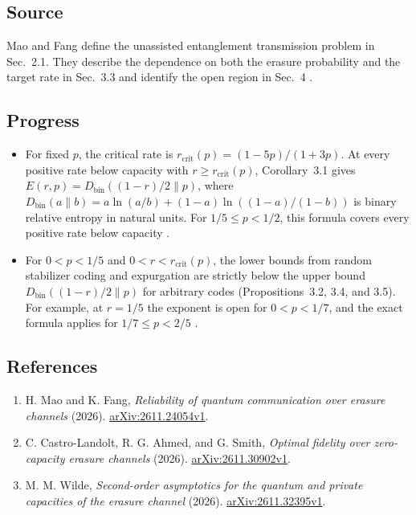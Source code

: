 \subsection*{Source}

Mao and Fang define the unassisted entanglement transmission problem in Sec.~2.1. They describe the dependence on both the erasure probability and the target rate in Sec.~3.3 and identify the open region in Sec.~4 .

\subsection*{Progress}

\begin{itemize}
  \item For fixed $p$, the critical rate is $r_{\mathrm{crit}}(p)=(1-5p)/(1+3p)$. At every positive rate below capacity with $r\geq r_{\mathrm{crit}}(p)$, Corollary~3.1 gives $E(r,p)=D_{\mathrm{bin}}((1-r)/2\|p)$, where $D_{\mathrm{bin}}(a\|b)=a\ln(a/b)+(1-a)\ln((1-a)/(1-b))$ is binary relative entropy in natural units. For $1/5\leq p<1/2$, this formula covers every positive rate below capacity .

  \item For $0<p<1/5$ and $0<r<r_{\mathrm{crit}}(p)$, the lower bounds from random stabilizer coding and expurgation are strictly below the upper bound $D_{\mathrm{bin}}((1-r)/2\|p)$ for arbitrary codes (Propositions~3.2, 3.4, and 3.5). For example, at $r=1/5$ the exponent is open for $0<p<1/7$, and the exact formula applies for $1/7\leq p<2/5$ .
\end{itemize}

\subsection*{References}

\begin{enumerate}[label={},leftmargin=4.8em,labelsep=0.5em]
  \footnotesize
  \item[\textup{[MF26]}]\label{ref:erasure-low-mao-fang}
  H. Mao and K. Fang, \emph{Reliability of quantum communication over erasure channels} (2026). \href{https://arxiv.org/abs/2611.24054v1}{arXiv:2611.24054v1}.

  \item[\textup{[CAS26]}]\label{ref:erasure-low-cas}
  C. Castro-Landolt, R. G. Ahmed, and G. Smith, \emph{Optimal fidelity over zero-capacity erasure channels} (2026). \href{https://arxiv.org/abs/2611.30902v1}{arXiv:2611.30902v1}.

  \item[\textup{[Wil26]}]\label{ref:erasure-low-wilde}
  M. M. Wilde, \emph{Second-order asymptotics for the quantum and private capacities of the erasure channel} (2026). \href{https://arxiv.org/abs/2611.32395v1}{arXiv:2611.32395v1}.
\end{enumerate}

